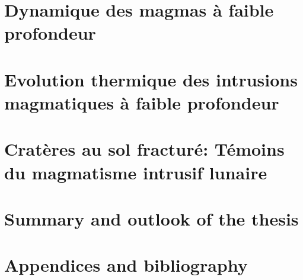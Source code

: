\documentclass[a4paper,12pt,twoside]{ThesisStyle}
\begin{document}


\dominitoc
\setcounter{tocdepth}{2}

\cleardoublepage



\cleardoublepage





\tableofcontents

\mainmatter
\part{Dynamique des magmas à faible profondeur}

\pagestyle{fancy}




\part{Evolution   thermique  des   intrusions  magmatiques   à  faible
  profondeur}




\part{Cratères au sol fracturé: Témoins du magmatisme intrusif lunaire}


      

\part{Summary and outlook of the thesis}





\part{Appendices and bibliography}

\appendix







\printnomenclature



\end{document}
